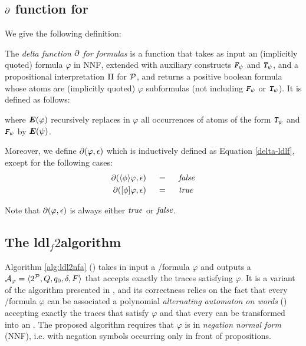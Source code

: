 \subsection{$\partial$ function for \LDLf} \label{ldlf-delta-section}
We give the following definition:
\begin{definition}\label{ldlf-delta-def}
	The \emph{delta function $\partial$ for \LDLf formulas} is a function that takes as input an (implicitly quoted) \LDLf
	formula $\varphi$ in NNF, extended with auxiliary constructs $\textit{\textbf{\texttt{F}}}_{\psi}$ and $\textit{\textbf{\texttt{T}}}_{\psi}$, and a propositional interpretation $\Pi$ for $\mathcal{P}$, and returns a positive boolean formula whose atoms are (implicitly
	quoted) $\varphi$ subformulas (not including $\textit{\textbf{\texttt{F}}}_{\psi}$ or $\textit{\textbf{\texttt{T}}}_{\psi}$). It is defined as follows:
	
	where $\textbf{\textit{E}} (\varphi)$ recursively replaces in $\varphi$ all occurrences of atoms of the form $\textit{\textbf{\texttt{T}}}_{\psi}$ and $\textit{\textbf{\texttt{F}}}_{\psi}$ by $\textbf{\textit{E}}(\psi)$.
	
	Moreover, we define $\partial\lparen \varphi, \epsilon\rparen$ which is inductively defined as Equation \ref{delta-ldlf}, except for the following cases:
	\begin{align}
	\begin{aligned}
	\partial\lparen \langle \phi \rangle\varphi, \epsilon\rparen 	\hspace*{.18in} &= \hspace*{.18in}   \mathit{false}\\
	\partial\lparen [\phi]\varphi, \epsilon\rparen 	\hspace*{.18in} &= \hspace*{.18in}   \mathit{true}
	\label{delta-ldlf-eps}
	\end{aligned}					
	\end{align}
\end{definition}
Note that $\partial\lparen \varphi, \epsilon\rparen$ is always either $\mathit{true}$ or $\mathit{false}$.
\subsection{The {\sc ldl}$_f2$\NFA algorithm}\label{sect:ldlf2nfa}
 Algorithm \ref{alg:ldl2nfa} (\LDLfToNFA) takes in input a \LDLf/\LTLf formula $\varphi$ and outputs a \NFA $\mathcal{A}_\varphi = \langle 2^{\mathcal{P}}, Q, q_0, \delta, F \rangle$ that accepts exactly the traces satisfying $\varphi$. It is a variant of the algorithm presented in \citep{DeGiacomo:2015:SLL:2832415.2832466}, and its correctness relies on the fact that every \LDLf/\LTLf formula $\varphi$ can be associated a polynomial \emph{alternating automaton on words} (\AFW) accepting exactly the traces that satisfy $\varphi$ and that every \AFW can be transformed into an \NFA \citep{de2013linear}.
The proposed algorithm requires that $\varphi$ is in \emph{negation normal form} (NNF), i.e. with negation symbols occurring only in front of propositions. 

